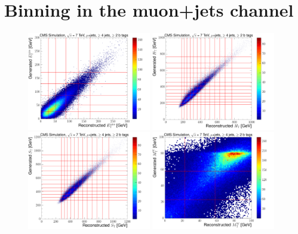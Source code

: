 \section{Binning in the muon+jets channel}
\label{as:binning_muon}

\begin{figure}[H]
    \centering
     \includegraphics[width=0.48\textwidth]{Chapters/07_08_09_Analysis/Images/binning/muon_MET_7TeV.pdf}\hfill
     \includegraphics[width=0.48\textwidth]{Chapters/07_08_09_Analysis/Images/binning/muon_HT_7TeV.pdf}\\
     \includegraphics[width=0.48\textwidth]{Chapters/07_08_09_Analysis/Images/binning/muon_ST_7TeV.pdf}\hfill
     \includegraphics[width=0.48\textwidth]{Chapters/07_08_09_Analysis/Images/binning/muon_MT_7TeV.pdf}\\

\end{figure}

